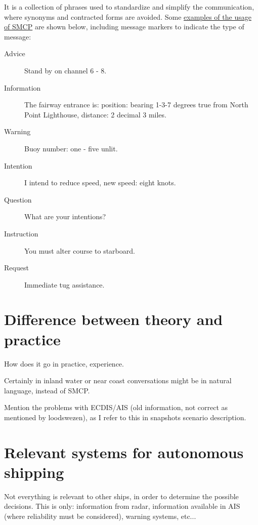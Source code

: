 It is a collection of phrases used to standardize and simplify the communication, where synonyms and contracted forms are avoided. Some \href{http://www.segeln.co.at/media/pdf/smcp.pdf}{examples of the usage of \ac{SMCP}} are shown below, including message markers to indicate the type of message:
\begin{description}
	\item [Advice] Stand by on channel 6 - 8.
	\item [Information] The fairway entrance is: position: bearing 1-3-7 degrees true from North Point Lighthouse, distance: 2 decimal 3 miles.
	\item [Warning] Buoy number: one - five unlit.
	\item [Intention] I intend to reduce speed, new speed: eight knots.
	\item [Question] What are your intentions?
	\item [Instruction] You must alter course to starboard.
	\item [Request] Immediate tug assistance.
\end{description}

\section{Difference between theory and practice}

How does it go in practice, experience. 

Certainly in inland water or near coast conversations might be in natural language, instead of \ac{SMCP}.

Mention the problems with ECDIS/AIS (old information, not correct as mentioned by loodswezen), as I refer to this in snapshots scenario description. 

\section{Relevant systems for autonomous shipping}
\label{sec:relevant-systems}
Not everything is relevant to other ships, in order to determine the possible decisions. This is only: information from radar, information available in AIS (where reliability must be considered), warning systems, etc...

